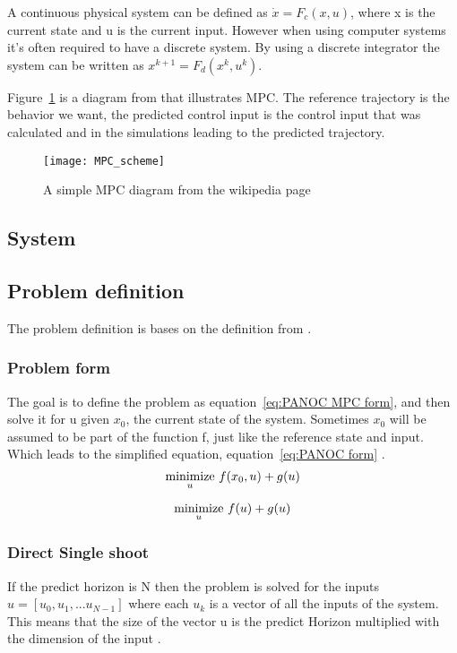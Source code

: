 	A continuous physical system can be defined as $\dot{x}=F_c(x,u)$, where x is the current state and u is the current input. However when using computer systems it's often required to have a discrete system. By using a discrete integrator the system can be written as $x^{k+1}=F_d(x^{k},u^{k})$. 
	
	Figure~\ref{fig:MPC diagram} is a diagram from \cite{Wikipedia} that illustrates MPC. The reference trajectory is the behavior we want, the predicted control input is the control input that was calculated and in the simulations leading to the predicted trajectory.
	\begin{figure}[h]
		\centering
		\texttt{[image: MPC\_scheme]}
		\caption{A simple MPC diagram from the wikipedia page \cite{Wikipedia}}
		\label{fig:MPC diagram}
	\end{figure}
			
	\subsection{System}
		
	\subsection{Problem definition}
	The problem definition is bases on the definition from \cite{Diehl2005}.
		\subsubsection{Problem form}
			The goal is to define the problem as equation~\ref{eq:PANOC MPC form}, and then solve it for u given $x_0$, the current state of the system. Sometimes $x_0$ will be assumed to be part of the function f, just like the reference state and input. Which leads to the simplified equation, equation~\ref{eq:PANOC form} .
			\begin{equation}
				\underset{u}{\operatorname*{minimize}} \  f(x_0,u) + g(u)
				\label{eq:PANOC MPC form}
			\end{equation}
			
			\begin{equation}
				\underset{u}{\operatorname*{minimize}} \  f(u) + g(u)
				\label{eq:PANOC form}
			\end{equation}
		\subsubsection{Direct Single shoot}
			If the predict horizon is N then the problem is solved for the inputs $u=[u_0,u_1,... u_{N-1}]$ where each $u_k$ is a vector of all the inputs of the system. This means that the size of the vector u is the predict Horizon multiplied with the dimension of the input .
			
